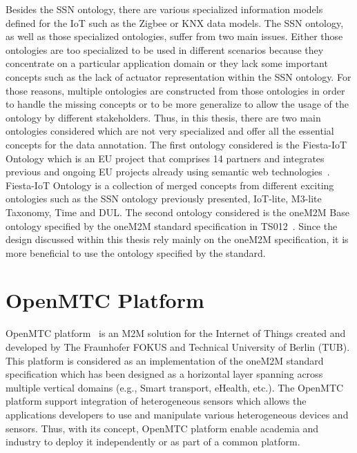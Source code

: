 Besides the SSN ontology, there are various specialized information models defined for the IoT such as the Zigbee or KNX data models. The SSN ontology, as well as those specialized ontologies, suffer from two main issues. Either those ontologies are too specialized to be used in different scenarios because they concentrate on a particular application domain or they lack some important concepts such as the lack of actuator representation within the SSN ontology. For those reasons, multiple ontologies are constructed from those ontologies in order to handle the missing concepts or to be more generalize to allow the usage of the ontology by different stakeholders. Thus, in this thesis, there are two main ontologies considered which are not very specialized and offer all the essential concepts for the data annotation. The first ontology considered is the Fiesta-IoT Ontology which is an EU project that comprises 14 partners and integrates previous and ongoing EU projects already using semantic web technologies~\cite{fiesta1}. Fiesta-IoT Ontology is a collection of merged concepts from different exciting ontologies such as the SSN ontology previously presented, IoT-lite, M3-lite Taxonomy, Time and DUL. The second ontology considered is the oneM2M Base ontology specified by the oneM2M standard specification in TS012~\cite{baseontology}. Since the design discussed within this thesis rely mainly on the oneM2M specification, it is more beneficial to use the ontology specified by the standard.


\section{OpenMTC Platform}

OpenMTC platform~\cite{openmtc} is an M2M solution for the Internet of Things created and developed by The Fraunhofer FOKUS and Technical University of Berlin (TUB). This platform is considered as an implementation of the oneM2M standard specification which has been designed as a horizontal layer spanning across multiple vertical domains (e.g., Smart transport, eHealth, etc.). The OpenMTC platform support integration of heterogeneous sensors which allows the applications developers to use and manipulate various heterogeneous devices and sensors. Thus, with its concept, OpenMTC platform enable academia and industry to deploy it independently or as part of a common platform.\par 

